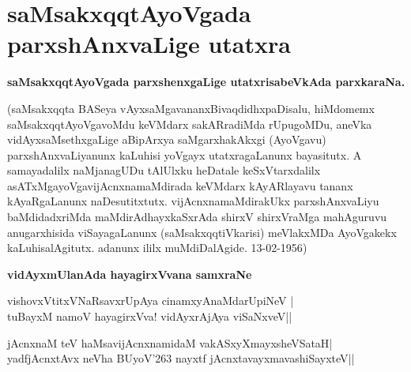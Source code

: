\chapter{saMsakxqqtAyoVgada parxshAnxvaLige utatxra}

\noindent
\textbf{saMsakxqqtAyoVgada parxshenxgaLige utatxrisabeVkAda parxkaraNa.}\label{page19}

(saMsakxqqta BASeya vAyxsaMgavananxBivaqdidhxpaDisalu, hiMdomemx saMsakxqqtAyoVgavoMdu keVMdarx sakARradiMda rUpugoMDu, aneVka vidAyxsaMsethxgaLige aBipArxya saMgarxhakAkxgi (AyoVgavu) parxshAnxvaLiyanunx kaLuhisi yoVgayx utatxragaLanunx bayasitutx. A samayadalilx naMjanagUDu tAlUlxku heDatale keSxVtarxdalilx asATxMgayoVgavijAcnxnamaMdirada keVMdarx kAyARlayavu tananx kAyaRgaLanunx naDesutitxtutx. vijAcnxnamaMdirakUkx  parxshAnxvaLiyu baMdidadxriMda maMdirAdhayxkaSxrAda shirxV shirxVraMga mahAguruvu anugarxhisida viSayagaLanunx (saMsakxqqtiVkarisi) meVlakxMDa AyoVgakekx kaLuhisalAgitutx. adanunx ililx muMdiDalAgide. {\rm 13-02-1956})  

\noindent
\textbf{vidAyxmUlanAda hayagirxVvana samxraNe}\label{page19}

\begin{shloka}
vishovxVtitxVNaRsavxrUpAya cinamxyAnaMdarUpiNeV |\\\label{19}
tuBayxM namoV hayagirxVva! vidAyxrAjAya viSaNxveV||
\end{shloka}

\begin{shloka}
jAcnxnaM teV haMsavijAcnxnamidaM vakASxyXmayxsheVSataH|\\\label{19}
yadfjAcnxtAvx neVha BUyoV\char'263 nayxtf jAcnxtavayxmavashiSayxteV||
\end{shloka}

